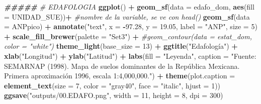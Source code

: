 \documentclass[
  11pt,
  letterpaper,
  DIV=11,
  numbers=noendperiod]{scrartcl}
\newenvironment{Shaded}{\begin{snugshade}}{\end{snugshade}}
\newcommand{\AttributeTok}[1]{\textcolor[rgb]{0.13,0.29,0.53}{#1}}
\newcommand{\CommentTok}[1]{\textcolor[rgb]{0.56,0.35,0.01}{\textit{#1}}}
\newcommand{\DecValTok}[1]{\textcolor[rgb]{0.00,0.00,0.81}{#1}}
\newcommand{\DocumentationTok}[1]{\textcolor[rgb]{0.56,0.35,0.01}{\textbf{\textit{#1}}}}
\newcommand{\FloatTok}[1]{\textcolor[rgb]{0.00,0.00,0.81}{#1}}
\newcommand{\FunctionTok}[1]{\textcolor[rgb]{0.13,0.29,0.53}{\textbf{#1}}}
\newcommand{\NormalTok}[1]{#1}
\newcommand{\SpecialCharTok}[1]{\textcolor[rgb]{0.81,0.36,0.00}{\textbf{#1}}}
\newcommand{\StringTok}[1]{\textcolor[rgb]{0.31,0.60,0.02}{#1}}
\begin{document}
\begin{Shaded}
\begin{Highlighting}[numbers=left,,]
\DocumentationTok{\#\#\#\#\#}
\CommentTok{\# EDAFOLOGIA}
\FunctionTok{ggplot}\NormalTok{() }\SpecialCharTok{+}
  \FunctionTok{geom\_sf}\NormalTok{(}\AttributeTok{data =}\NormalTok{ edafo\_dom, }\FunctionTok{aes}\NormalTok{(}\AttributeTok{fill =}\NormalTok{ UNIDAD\_SUE))}\SpecialCharTok{+} \CommentTok{\#nombre de la variable, se ve con head()}
  \FunctionTok{geom\_sf}\NormalTok{(}\AttributeTok{data =}\NormalTok{ ANPpico) }\SpecialCharTok{+}
  \FunctionTok{annotate}\NormalTok{(}\StringTok{"text"}\NormalTok{, }\AttributeTok{x =} \SpecialCharTok{{-}}\FloatTok{97.28}\NormalTok{, }\AttributeTok{y =} \FloatTok{19.05}\NormalTok{, }\AttributeTok{label =} \StringTok{"ANP"}\NormalTok{, }\AttributeTok{size =} \DecValTok{5}\NormalTok{) }\SpecialCharTok{+}
  \FunctionTok{scale\_fill\_brewer}\NormalTok{(}\AttributeTok{palette =} \StringTok{"Set3"}\NormalTok{) }\SpecialCharTok{+}
  \CommentTok{\#geom\_contour(data = estat\_dom, color = "white")}
  \FunctionTok{theme\_light}\NormalTok{(}\AttributeTok{base\_size =} \DecValTok{13}\NormalTok{) }\SpecialCharTok{+}
  \FunctionTok{ggtitle}\NormalTok{(}\StringTok{"Edafología"}\NormalTok{) }\SpecialCharTok{+} \FunctionTok{xlab}\NormalTok{(}\StringTok{"Longitud"}\NormalTok{) }\SpecialCharTok{+} \FunctionTok{ylab}\NormalTok{(}\StringTok{"Latitud"}\NormalTok{) }\SpecialCharTok{+}
  \FunctionTok{labs}\NormalTok{(}\AttributeTok{fill =} \StringTok{"Leyenda"}\NormalTok{,}
       \AttributeTok{caption =} \StringTok{"Fuente: SEMARNAP (1998). Mapa de suelos dominantes}
\StringTok{       de la República Mexicana. Primera aproximación 1996,}
\StringTok{       escala 1:4,000,000."}\NormalTok{) }\SpecialCharTok{+}
  \FunctionTok{theme}\NormalTok{(}\AttributeTok{plot.caption =} \FunctionTok{element\_text}\NormalTok{(}\AttributeTok{size =} \DecValTok{7}\NormalTok{, }\AttributeTok{color =} \StringTok{"gray40"}\NormalTok{, }\AttributeTok{face =} \StringTok{"italic"}\NormalTok{, }\AttributeTok{hjust =} \DecValTok{1}\NormalTok{))}
\FunctionTok{ggsave}\NormalTok{(}\StringTok{"outputs/00.EDAFO.png"}\NormalTok{, }\AttributeTok{width =} \DecValTok{11}\NormalTok{, }\AttributeTok{height =} \DecValTok{8}\NormalTok{, }\AttributeTok{dpi =} \DecValTok{300}\NormalTok{)}



\end{Highlighting}
\end{Shaded}
\end{document}
